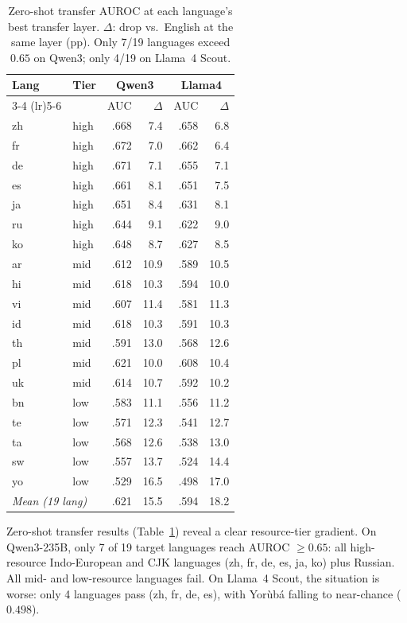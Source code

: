 \documentclass[11pt,a4paper]{article}
\begin{document}
\begin{table}[t]
\centering
\small
\begin{tabular}{llrrrr}
\toprule
\textbf{Lang} & \textbf{Tier} & \multicolumn{2}{c}{\textbf{Qwen3}} & \multicolumn{2}{c}{\textbf{Llama4}} \\
\cmidrule(lr){3-4} \cmidrule(lr){5-6}
& & AUC & $\Delta$ & AUC & $\Delta$ \\
\midrule
zh & high & .668 & 7.4 & .658 & 6.8 \\
fr & high & .672 & 7.0 & .662 & 6.4 \\
de & high & .671 & 7.1 & .655 & 7.1 \\
es & high & .661 & 8.1 & .651 & 7.5 \\
ja & high & .651 & 8.4 & .631 & 8.1 \\
ru & high & .644 & 9.1 & .622 & 9.0 \\
ko & high & .648 & 8.7 & .627 & 8.5 \\
\midrule
ar & mid  & .612 & 10.9 & .589 & 10.5 \\
hi & mid  & .618 & 10.3 & .594 & 10.0 \\
vi & mid  & .607 & 11.4 & .581 & 11.3 \\
id & mid  & .618 & 10.3 & .591 & 10.3 \\
th & mid  & .591 & 13.0 & .568 & 12.6 \\
pl & mid  & .621 & 10.0 & .608 & 10.4 \\
uk & mid  & .614 & 10.7 & .592 & 10.2 \\
\midrule
bn & low  & .583 & 11.1 & .556 & 11.2 \\
te & low  & .571 & 12.3 & .541 & 12.7 \\
ta & low  & .568 & 12.6 & .538 & 13.0 \\
sw & low  & .557 & 13.7 & .524 & 14.4 \\
yo & low  & .529 & 16.5 & .498 & 17.0 \\
\midrule
\multicolumn{2}{l}{\textit{Mean (19 lang)}} & .621 & 15.5 & .594 & 18.2 \\
\bottomrule
\end{tabular}
\caption{Zero-shot transfer AUROC at each language's best transfer layer. $\Delta$: drop vs.\ English at the same layer (pp). Only 7/19 languages exceed $0.65$ on Qwen3; only 4/19 on Llama~4 Scout.}
\label{tab:zs_transfer}
\end{table}

Zero-shot transfer results (Table~\ref{tab:zs_transfer}) reveal a clear resource-tier gradient.
On Qwen3-235B, only 7 of 19 target languages reach AUROC $\geq 0.65$: all high-resource Indo-European and CJK languages (zh, fr, de, es, ja, ko) plus Russian.
All mid- and low-resource languages fail.
On Llama~4 Scout, the situation is worse: only 4 languages pass (zh, fr, de, es), with Yor\`{u}b\'{a} falling to near-chance ($0.498$).
\end{document}

